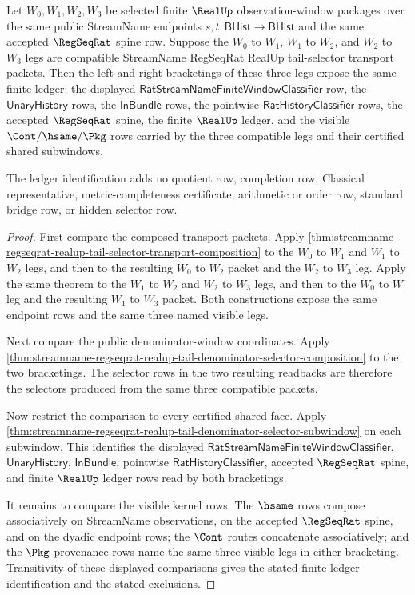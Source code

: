 \begin{theorem}
\label{thm:streamname-regseqrat-realup-tail-selector-ledger-associativity}
Let $W_0,W_1,W_2,W_3$ be selected finite $\RealUp$ observation-window
packages over the same public StreamName endpoints
$s,t:\mathsf{BHist}\to\mathsf{BHist}$ and the same accepted $\RegSeqRat$
spine row. Suppose the $W_0$ to $W_1$, $W_1$ to $W_2$, and $W_2$ to $W_3$
legs are compatible StreamName RegSeqRat RealUp tail-selector transport
packets. Then the left and right bracketings of these three legs expose the
same finite ledger: the displayed
$\mathsf{RatStreamNameFiniteWindowClassifier}$ row, the
$\mathsf{UnaryHistory}$ rows, the $\mathsf{InBundle}$ rows, the pointwise
$\mathsf{RatHistoryClassifier}$ rows, the accepted $\RegSeqRat$ spine, the
finite $\RealUp$ ledger, and the visible $\Cont/\hsame/\Pkg$ rows carried by
the three compatible legs and their certified shared subwindows.

The ledger identification adds no quotient row, completion row, Classical
representative, metric-completeness certificate, arithmetic or order row,
standard bridge row, or hidden selector row.
\end{theorem}
\begin{proof}
First compare the composed transport packets. Apply
\autoref{thm:streamname-regseqrat-realup-tail-selector-transport-composition}
to the $W_0$ to $W_1$ and $W_1$ to $W_2$ legs, and then to the resulting
$W_0$ to $W_2$ packet and the $W_2$ to $W_3$ leg. Apply the same theorem to
the $W_1$ to $W_2$ and $W_2$ to $W_3$ legs, and then to the $W_0$ to $W_1$
leg and the resulting $W_1$ to $W_3$ packet. Both constructions expose the
same endpoint rows and the same three named visible legs.

Next compare the public denominator-window coordinates. Apply
\autoref{thm:streamname-regseqrat-realup-tail-denominator-selector-composition}
to the two bracketings. The selector rows in the two resulting readbacks are
therefore the selectors produced from the same three compatible packets.

Now restrict the comparison to every certified shared face. Apply
\autoref{thm:streamname-regseqrat-realup-tail-denominator-selector-subwindow}
on each subwindow. This identifies the displayed
$\mathsf{RatStreamNameFiniteWindowClassifier}$, $\mathsf{UnaryHistory}$,
$\mathsf{InBundle}$, pointwise $\mathsf{RatHistoryClassifier}$, accepted
$\RegSeqRat$ spine, and finite $\RealUp$ ledger rows read by both
bracketings.

It remains to compare the visible kernel rows. The $\hsame$ rows compose
associatively on StreamName observations, on the accepted $\RegSeqRat$ spine,
and on the dyadic endpoint rows; the $\Cont$ routes concatenate
associatively; and the $\Pkg$ provenance rows name the same three visible
legs in either bracketing. Transitivity of these displayed comparisons gives
the stated finite-ledger identification and the stated exclusions.
\end{proof}

